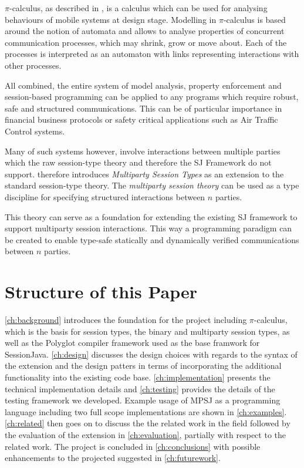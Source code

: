 $\pi$-calculus, as described in \cite{pi-calculus}, is a calculus which can be used for analysing behaviours of mobile systems at design stage. Modelling in $\pi$-calculus is based around the notion of automata and allows to analyse properties of concurrent communication processes, which may shrink, grow or move about. Each of the processes is interpreted as an automaton with links representing interactions with other processes.

All combined, the entire system of model analysis, property enforcement and session-based programming can be applied to any programs which require robust, safe and structured communications. This can be of particular importance in financial business protocols or safety critical applications such as Air Traffic Control systems.

Many of such systems however, involve interactions between multiple parties which the raw session-type theory and therefore the SJ Framework do not support. \cite{multiparty_sess_types} therefore introduces \textit{Multiparty Session Types} as an extension to the standard session-type theory. The \textit{multiparty session theory} can be used as a type discipline for specifying structured interactions between $n$ parties.

This theory can serve as a foundation for extending the existing SJ framework to support multiparty session interactions. This way a programming paradigm can be created to enable type-safe statically and dynamically verified communications between $n$ parties. 

\section{Structure of this Paper}

\autoref{ch:background} introduces the foundation for the project including $\pi$-calculus, which is the basis for session types, the binary and multiparty session types, as well as the Polyglot compiler framework used as the base framwork for SessionJava. \autoref{ch:design} discusses the design choices with regards to the syntax of the extension and the design patters in terms of incorporating the additional functionality into the existing code base. \autoref{ch:implementation} presents the technical implementation details and \autoref{ch:testing} provides the details of the testing framework we developed. Example usage of MPSJ as a programming language including two full scope implementations are shown in \autoref{ch:examples}. \autoref{ch:related} then goes on to discuss the the related work in the field followed by the evaluation of the extension in \autoref{ch:evaluation}, partially with respect to the related work. The project is concluded in \autoref{ch:conclusions} with possible enhancements to the projected suggested in \autoref{ch:futurework}.


